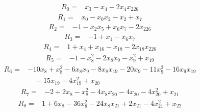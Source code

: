 \begingroup\small
\begin{equation*}\begin{split}
R_{0}={}&x_{3} - x_{4} - 2x_{4} x_{226}
\end{split}\end{equation*}
\begin{equation*}\begin{split}
R_{1}={}&x_{0} - x_{0} x_{2} - x_{2} + x_{7}
\end{split}\end{equation*}
\begin{equation*}\begin{split}
R_{2}={}&-1 - x_{2} x_{5} + x_{6} x_{7} - 2x_{226}
\end{split}\end{equation*}
\begin{equation*}\begin{split}
R_{3}={}&-1 + x_{1} - x_{6} x_{7}
\end{split}\end{equation*}
\begin{equation*}\begin{split}
R_{4}={}&1 + x_{4} + x_{16} - x_{18} - 2x_{18} x_{226}
\end{split}\end{equation*}
\begin{equation*}\begin{split}
R_{5}={}&-1 - x_{8}^{2} - 2x_{8} x_{9} - x_{9}^{2} + x_{19}
\end{split}\end{equation*}
\begin{equation*}\begin{split}
R_{6}={}&-10x_{8} + x_{8}^{2} - 6x_{8} x_{9} - 8x_{8} x_{19} - 20x_{9} - 11x_{9}^{2} - 16x_{9} x_{19}\\
&\quad -15x_{19} - 4x_{19}^{2} + x_{20}
\end{split}\end{equation*}
\begin{equation*}\begin{split}
R_{7}={}&-2 + 2x_{8} - x_{8}^{2} - 4x_{8} x_{20} - 4x_{20} - 4x_{20}^{2} + x_{21}
\end{split}\end{equation*}
\begin{equation*}\begin{split}
R_{8}={}&1 + 6x_{8} - 36x_{8}^{2} - 24x_{8} x_{21} + 2x_{21} - 4x_{21}^{2} + x_{22}
\end{split}\end{equation*}
